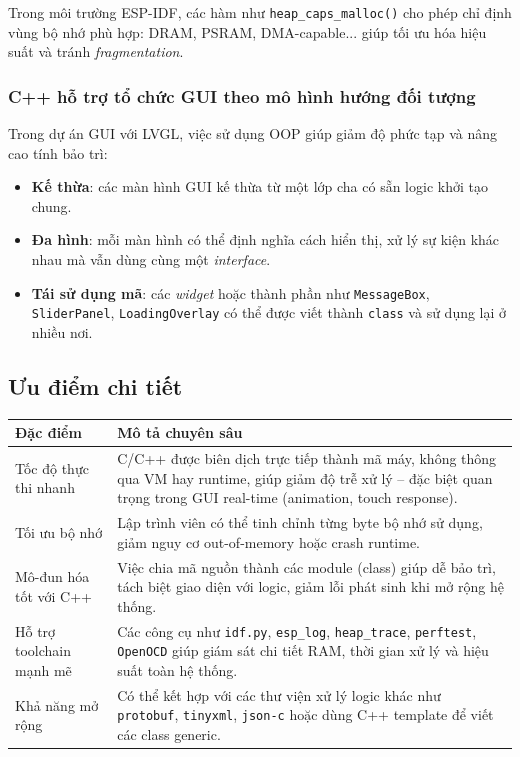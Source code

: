 Trong môi trường ESP-IDF, các hàm như \texttt{heap\_caps\_malloc()} cho phép chỉ định vùng bộ nhớ phù hợp: DRAM, PSRAM, DMA-capable... giúp tối ưu hóa hiệu suất và tránh \textit{fragmentation}.

\subsubsection{C++ hỗ trợ tổ chức GUI theo mô hình hướng đối tượng}
Trong dự án GUI với LVGL, việc sử dụng OOP giúp giảm độ phức tạp và nâng cao tính bảo trì:
\begin{itemize}
  \item \textbf{Kế thừa}: các màn hình GUI kế thừa từ một lớp cha có sẵn logic khởi tạo chung.
  \item \textbf{Đa hình}: mỗi màn hình có thể định nghĩa cách hiển thị, xử lý sự kiện khác nhau mà vẫn dùng cùng một \textit{interface}.
  \item \textbf{Tái sử dụng mã}: các \textit{widget} hoặc thành phần như \texttt{MessageBox}, \texttt{SliderPanel}, \texttt{LoadingOverlay} có thể được viết thành \texttt{class} và sử dụng lại ở nhiều nơi.
\end{itemize}

\subsection{Ưu điểm chi tiết}

\begin{table}[H]
\centering
\begin{tabular}{|p{4.5cm}|p{10cm}|}
\hline
\textbf{Đặc điểm} & \textbf{Mô tả chuyên sâu} \\
\hline
Tốc độ thực thi nhanh & C/C++ được biên dịch trực tiếp thành mã máy, không thông qua VM hay runtime, giúp giảm độ trễ xử lý – đặc biệt quan trọng trong GUI real-time (animation, touch response). \\
\hline
Tối ưu bộ nhớ & Lập trình viên có thể tinh chỉnh từng byte bộ nhớ sử dụng, giảm nguy cơ out-of-memory hoặc crash runtime. \\
\hline
Mô-đun hóa tốt với C++ & Việc chia mã nguồn thành các module (class) giúp dễ bảo trì, tách biệt giao diện với logic, giảm lỗi phát sinh khi mở rộng hệ thống. \\
\hline
Hỗ trợ toolchain mạnh mẽ & Các công cụ như \texttt{idf.py}, \texttt{esp\_log}, \texttt{heap\_trace}, \texttt{perftest}, \texttt{OpenOCD} giúp giám sát chi tiết RAM, thời gian xử lý và hiệu suất toàn hệ thống. \\
\hline
Khả năng mở rộng & Có thể kết hợp với các thư viện xử lý logic khác như \texttt{protobuf}, \texttt{tinyxml}, \texttt{json-c} hoặc dùng C++ template để viết các class generic. \\
\hline
\end{tabular}
\end{table}

